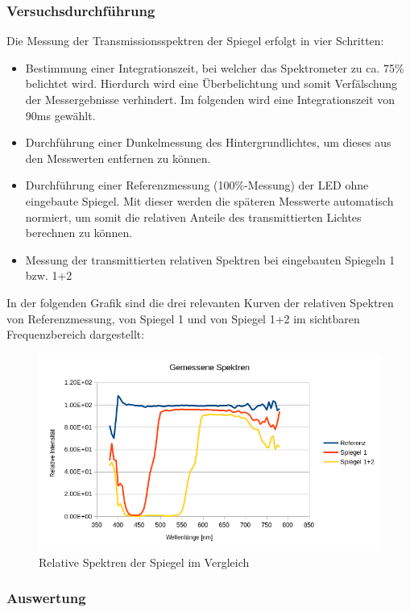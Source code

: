 \subsubsection{Versuchsdurchführung}

Die Messung der Transmissionsspektren der Spiegel erfolgt in vier Schritten:
\begin{itemize}
\item Bestimmung einer Integrationszeit, bei welcher das Spektrometer zu ca. 75\% belichtet wird. Hierdurch wird eine Überbelichtung und somit Verfälschung der Messergebnisse verhindert. Im folgenden wird eine Integrationszeit von 90ms gewählt.
\item Durchführung einer Dunkelmessung des Hintergrundlichtes, um dieses aus den Messwerten entfernen zu können.
\item Durchführung einer Referenzmessung (100\%-Messung) der LED ohne eingebaute Spiegel. Mit dieser werden die späteren Messwerte automatisch normiert, um somit die relativen Anteile des transmittierten Lichtes berechnen zu können.
\item Messung der transmittierten relativen Spektren bei eingebauten Spiegeln 1 bzw. 1+2
\end{itemize}
In der folgenden Grafik sind die drei relevanten Kurven der relativen Spektren von Referenzmessung, von Spiegel 1 und von Spiegel 1+2 im sichtbaren Frequenzbereich dargestellt:

\begin{figure}[h]
	\centering
	\includegraphics[scale=0.8]{Images/V1_Spektren.png}
	\caption{Relative Spektren der Spiegel im Vergleich}
	\label{V1_RES}
\end{figure}

\subsubsection{Auswertung}

